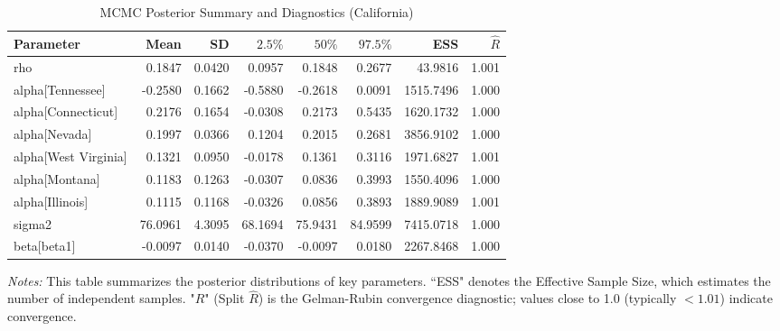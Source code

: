 \begin{table}[H]
\centering
\caption{\label{tab:tab:ca_diag}MCMC Posterior Summary and Diagnostics (California)}
\label{tab:ca_diag}
\centering
\footnotesize
\setlength{\tabcolsep}{2pt} 
\begin{tabular}[t]{lrrrrrrr}
\toprule
Parameter & Mean & SD & $2.5\%$ & $50\%$ & $97.5\%$ & ESS & $\hat{R}$\\
\midrule
rho & 0.1847 & 0.0420 & 0.0957 & 0.1848 & 0.2677 & 43.9816 & 1.001\\
alpha[Tennessee] & -0.2580 & 0.1662 & -0.5880 & -0.2618 & 0.0091 & 1515.7496 & 1.000\\
alpha[Connecticut] & 0.2176 & 0.1654 & -0.0308 & 0.2173 & 0.5435 & 1620.1732 & 1.000\\
alpha[Nevada] & 0.1997 & 0.0366 & 0.1204 & 0.2015 & 0.2681 & 3856.9102 & 1.000\\
alpha[West Virginia] & 0.1321 & 0.0950 & -0.0178 & 0.1361 & 0.3116 & 1971.6827 & 1.001\\
\addlinespace
alpha[Montana] & 0.1183 & 0.1263 & -0.0307 & 0.0836 & 0.3993 & 1550.4096 & 1.000\\
alpha[Illinois] & 0.1115 & 0.1168 & -0.0326 & 0.0856 & 0.3893 & 1889.9089 & 1.001\\
sigma2 & 76.0961 & 4.3095 & 68.1694 & 75.9431 & 84.9599 & 7415.0718 & 1.000\\
beta[beta1] & -0.0097 & 0.0140 & -0.0370 & -0.0097 & 0.0180 & 2267.8468 & 1.000\\
\bottomrule
\end{tabular}
\begin{tablenotes}
  \footnotesize
  \item \textit{Notes:} This table summarizes the posterior distributions of key parameters. ``ESS" denotes the Effective Sample Size, which estimates the number of independent samples. "$R$" (Split $\hat{R}$) is the Gelman-Rubin convergence diagnostic; values close to 1.0 (typically $< 1.01$) indicate convergence.
\end{tablenotes}
\end{table}